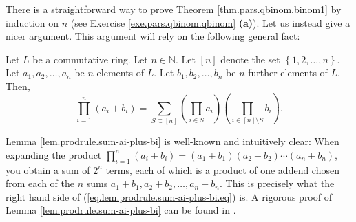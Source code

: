 There is a straightforward way to prove Theorem \ref{thm.pars.qbinom.binom1}
by induction on $n$ (see Exercise \ref{exe.pars.qbinom.qbinom} \textbf{(a)}).
Let us instead give a nicer argument. This argument will rely on the following
general fact:

\begin{lemma}
\label{lem.prodrule.sum-ai-plus-bi}Let $L$ be a commutative ring. Let
$n\in\mathbb{N}$. Let $\left[  n\right]  $ denote the set $\left\{
1,2,\ldots,n\right\}  $. Let $a_{1},a_{2},\ldots,a_{n}$ be $n$ elements of
$L$. Let $b_{1},b_{2},\ldots,b_{n}$ be $n$ further elements of $L$. Then,%
\begin{equation}
\prod_{i=1}^{n}\left(  a_{i}+b_{i}\right)  =\sum_{S\subseteq\left[  n\right]
}\left(  \prod_{i\in S}a_{i}\right)  \left(  \prod_{i\in\left[  n\right]
\setminus S}b_{i}\right)  . \label{eq.lem.prodrule.sum-ai-plus-bi.eq}%
\end{equation}

\end{lemma}

Lemma \ref{lem.prodrule.sum-ai-plus-bi} is well-known and intuitively clear:
When expanding the product $\prod_{i=1}^{n}\left(  a_{i}+b_{i}\right)
=\left(  a_{1}+b_{1}\right)  \left(  a_{2}+b_{2}\right)  \cdots\left(
a_{n}+b_{n}\right)  $, you obtain a sum of $2^{n}$ terms, each of which is a
product of one addend chosen from each of the $n$ sums $a_{1}+b_{1}%
,a_{2}+b_{2},\ldots,a_{n}+b_{n}$. This is precisely what the right hand side
of (\ref{eq.lem.prodrule.sum-ai-plus-bi.eq}) is. A rigorous proof of Lemma
\ref{lem.prodrule.sum-ai-plus-bi} can be found in \cite[Exercise 6.1
\textbf{(a)}]{detnotes}.

